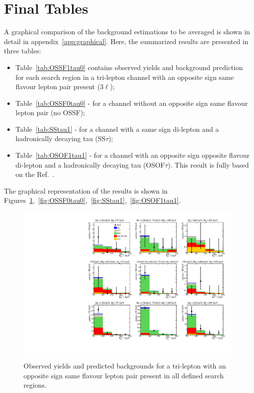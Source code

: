 \section{Final Tables}
A graphical comparison of the background estimations to be averaged is shown in detail in appendix~\ref{app:graphical}. 
Here, the summarized results are presented in three tables: 
\begin{itemize}
\item Table~\ref{tab:OSSF1tau0} contains observed yields  and background prediction 
for each search region in a tri-lepton channel with an opposite sign same flavour lepton pair present (3$\ell$);
\item Table~\ref{tab:OSSF0tau0}  - for a channel without  an opposite sign same flavour lepton pair (no OSSF);
\item Table~\ref{tab:SStau1} - for a channel with a same sign di-lepton and a hadronically decaying tau (SS$\tau$);
\item Table~\ref{tab:OSOF1tau1} - for a channel with an opposite sign opposite flavour di-lepton and a hadronically decaying tau (OSOF$\tau$). This result is fully based on the Ref.~\cite{AN2012:255}.
\end{itemize}

The graphical representation of the results is shown in Figures~\ref{fig:OSSF1tau0},~\ref{fig:OSSF0tau0},~\ref{fig:SStau1},~\ref{fig:OSOF1tau1}.

\begin{figure}[htp]
\begin{center}
\includegraphics[width=1.0\textwidth]{plots/ossf1tau0.pdf}
\caption{Observed yields and predicted backgrounds for a tri-lepton with an opposite sign same flavour lepton pair present in all defined search regions.}
\label{fig:OSSF1tau0}
\end{center}
\end{figure}

